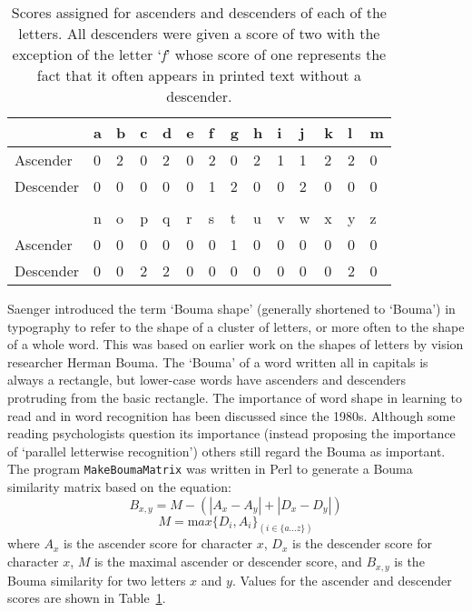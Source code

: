 \documentclass{article}
\newcommand{\eg}[1]{\mbox{`\emph{#1}'}}
\begin{document}
\begin{table}
\begin{center}
\begin{tabular}{llllllllllllll}\hline
          & a & b & c & d & e & f & g & h & i & j & k & l & m \\ \hline
Ascender  & 0 & 2 & 0 & 2 & 0 & 2 & 0 & 2 & 1 & 1 & 2 & 2 & 0 \\
Descender & 0 & 0 & 0 & 0 & 0 & 1 & 2 & 0 & 0 & 2 & 0 & 0 & 0 \\ \hline
          &   &   &   &   &   &   &   &   &   &   &   &   &   \\
          & n & o & p & q & r & s & t & u & v & w & x & y & z \\ \hline
Ascender  & 0 & 0 & 0 & 0 & 0 & 0 & 1 & 0 & 0 & 0 & 0 & 0 & 0 \\
Descender & 0 & 0 & 2 & 2 & 0 & 0 & 0 & 0 & 0 & 0 & 0 & 2 & 0 \\ \hline
\end{tabular}
\end{center}
  \caption{\label{tab:boumascores} Scores assigned for ascenders and
    descenders of each of the letters. All descenders were given a
    score of two with the exception of the letter \eg{f} whose score
    of one represents the fact that it often appears in printed text
    without a descender.}
\end{table}


Saenger\cite{saenger:bouma} introduced the term `Bouma shape'
(generally shortened to `Bouma') in typography to refer to the shape
of a cluster of letters, or more often to the shape of a whole
word. This was based on earlier work on the shapes of letters by
vision researcher Herman Bouma\cite{bouma:isolated,bouma:initial}.
The `Bouma' of a word written all in capitals is always a rectangle,
but lower-case words have ascenders and descenders protruding from the
basic rectangle. The importance of word shape in learning to read and
in word recognition has been discussed since the 1980s\cite[for
  example]{haber:wordshape}. Although some reading psychologists
question its importance (instead proposing the importance of `parallel
letterwise
recognition'\cite{rayner:span,paap:wordshape,larson:wordrecognition})
others still regard the Bouma as important\cite{glezer:bouma}.  The
program \verb|MakeBoumaMatrix| was written in Perl to generate a Bouma
similarity matrix based on the equation:
\begin{equation}
  B_{x,y} = M - (|A_x - A_y| + |D_x - D_y|)
\end{equation}
\begin{equation}
  M={\mathrm max}\{D_i, A_i\}_{(i\in \{a\ldots z\})}
\end{equation}
where $A_x$ is the ascender score for character $x$, $D_x$ is the
descender score for character $x$, $M$ is the maximal ascender or
descender score, and $B_{x,y}$ is the Bouma similarity for two letters
$x$ and $y$. Values for the ascender and descender scores are shown in
Table~\ref{tab:boumascores}.
\end{document}
